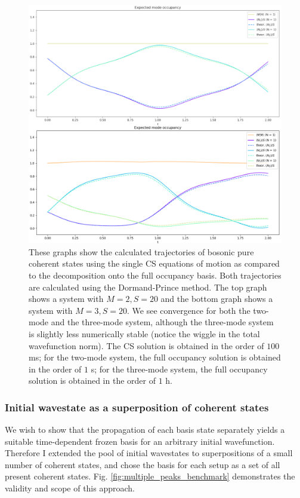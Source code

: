 \begin{figure} \label{fig:single_peak_benchmark}
\begin{center}
\includegraphics[width=\textwidth]{images/single_peak_benchmark}
\caption{These graphs show the calculated trajectories of bosonic pure coherent states using the single CS equations of motion as compared to the decomposition onto the full occupancy basis. Both trajectories are calculated using the Dormand-Prince method. The top graph shows a system with $M=2,S=20$ and the bottom graph shows a system with $M=3,S=20$. We see convergence for both the two-mode and the three-mode system, although the three-mode system is slightly less numerically stable (notice the wiggle in the total wavefunction norm). The CS solution is obtained in the order of $100$ ms; for the two-mode system, the full occupancy solution is obtained in the order of $1$ s; for the three-mode system, the full occupancy solution is obtained in the order of $1$ h.}
\end{center}
\end{figure}

\subsubsection{Initial wavestate as a superposition of coherent states}
We wish to show that the propagation of each basis state separately yields a suitable time-dependent frozen basis for an arbitrary initial wavefunction. Therefore I extended the pool of initial wavestates to superpositions of a small number of coherent states, and chose the basis for each setup as a set of all present coherent states. Fig. \ref{fig:multiple_peaks_benchmark} demonstrates the validity and scope of this approach.

